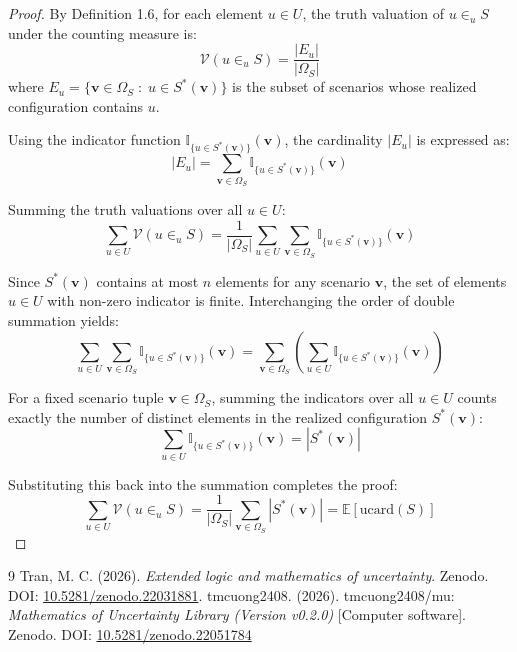 \documentclass[a4paper,14pt, twoside]{memoir}
\begin{document}
	\begin{proof}
		By Definition 1.6, for each element $u \in U$, the truth valuation of $u \in_u S$ under the counting measure is:
		\[
		\mathcal{V}(u \in_u S) = \frac{|E_u|}{|\Omega_S|}
		\]
		where $E_u = \{\mathbf{v} \in \Omega_S \;:\; u \in S^*(\mathbf{v})\}$ is the subset of scenarios whose realized configuration contains $u$.
		
		Using the indicator function $\mathbb{I}_{\{u \in S^*(\mathbf{v})\}}(\mathbf{v})$, the cardinality $|E_u|$ is expressed as:
		\[
		|E_u| = \sum_{\mathbf{v} \in \Omega_S} \mathbb{I}_{\{u \in S^*(\mathbf{v})\}}(\mathbf{v})
		\]
		
		Summing the truth valuations over all $u \in U$:
		\[
		\sum_{u \in U} \mathcal{V}(u \in_u S) = \frac{1}{|\Omega_S|} \sum_{u \in U} \sum_{\mathbf{v} \in \Omega_S} \mathbb{I}_{\{u \in S^*(\mathbf{v})\}}(\mathbf{v})
		\]
		
		Since $S^*(\mathbf{v})$ contains at most $n$ elements for any scenario $\mathbf{v}$, the set of elements $u \in U$ with non-zero indicator is finite. Interchanging the order of double summation yields:
		\[
		\sum_{u \in U} \sum_{\mathbf{v} \in \Omega_S} \mathbb{I}_{\{u \in S^*(\mathbf{v})\}}(\mathbf{v}) = \sum_{\mathbf{v} \in \Omega_S} \left( \sum_{u \in U} \mathbb{I}_{\{u \in S^*(\mathbf{v})\}}(\mathbf{v}) \right)
		\]
		
		For a fixed scenario tuple $\mathbf{v} \in \Omega_S$, summing the indicators over all $u \in U$ counts exactly the number of distinct elements in the realized configuration $S^*(\mathbf{v})$:
		\[
		\sum_{u \in U} \mathbb{I}_{\{u \in S^*(\mathbf{v})\}}(\mathbf{v}) = |S^*(\mathbf{v})|
		\]
		
		Substituting this back into the summation completes the proof:
		\[
		\sum_{u \in U} \mathcal{V}(u \in_u S) = \frac{1}{|\Omega_S|} \sum_{\mathbf{v} \in \Omega_S} |S^*(\mathbf{v})| = \mathbb{E}\left[\mathrm{ucard}(S)\right]
		\]
	\end{proof}
	
	\begin{thebibliography}{9}
		Tran, M. C. (2026). \textit{Extended logic and mathematics of uncertainty}. Zenodo. DOI: \href{https://doi.org/10.5281/zenodo.22031881}{10.5281/zenodo.22031881}.
		tmcuong2408. (2026). tmcuong2408/mu: \textit{Mathematics of Uncertainty Library (Version v0.2.0)} [Computer software]. Zenodo.
		DOI: \href{https://doi.org/10.5281/zenodo.22051784}{10.5281/zenodo.22051784}
	\end{thebibliography}
	
\end{document}
